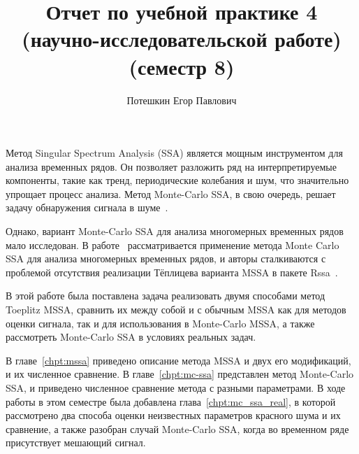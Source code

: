 \documentclass[specialist,
substylefile = spbu_report.rtx,
subf,href,colorlinks=true, 12pt]{disser}
\theoremstyle{definition}
\begin{document}
\setcounter{tocdepth}{2}
%
%

\title{Отчет по учебной практике 4 (научно-исследовательской работе) (семестр 8)}


\author{Потешкин Егор Павлович}


\date{\number\year}

\maketitle
\tableofcontents
\intro
Метод Singular Spectrum Analysis (SSA) является мощным инструментом для анализа временных рядов. Он позволяет разложить ряд на интерпретируемые компоненты, такие как тренд, периодические колебания и шум, что значительно упрощает процесс анализа. Метод Monte-Carlo SSA, в свою очередь, решает задачу обнаружения сигнала в шуме~\cite{Golyandina_2023}.

Однако, вариант Monte-Carlo SSA для анализа многомерных временных рядов мало исследован. В работе~\cite{Larin_2022} рассматривается применение метода Monte Carlo SSA для анализа многомерных временных рядов, и авторы сталкиваются с проблемой отсутствия реализации Тёплицева варианта MSSA в пакете Rssa~\cite{Rssa}.

В этой работе была поставлена задача реализовать двумя способами метод Toeplitz MSSA, сравнить их между собой и с обычным MSSA как для методов оценки сигнала, так и для использования в Monte-Carlo MSSA, а также рассмотреть Monte-Carlo SSA в условиях реальных задач.

В главе~\ref{chpt:mssa} приведено описание метода MSSA и двух его модификаций, и их численное сравнение. В главе~\ref{chpt:mc-ssa} представлен метод Monte-Carlo SSA, и приведено численное сравнение метода с разными параметрами. В ходе работы в этом семестре была добавлена глава~\ref{chpt:mc_ssa_real}, в которой рассмотрено два способа оценки неизвестных параметров красного шума и их сравнение, а также разобран случай Monte-Carlo SSA, когда во временном ряде присутствует мешающий сигнал. 
\end{document}
